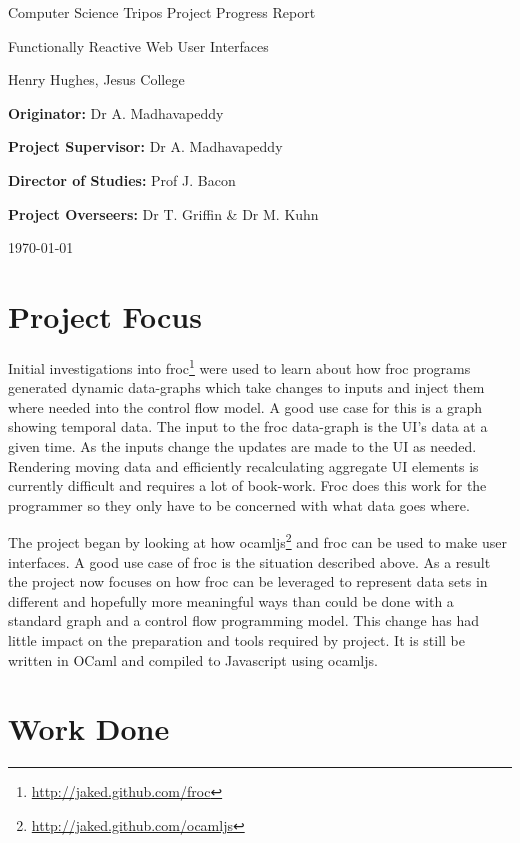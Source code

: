 \documentclass[10pt,a4paper]{article}
\begin{document}
  \begin{titlepage}
    \vfil
    \centerline{\Large Computer Science Tripos Project Progress Report}
    \vspace{0.4in}
    \centerline{\Huge Functionally Reactive Web User Interfaces }
    \vspace{0.4in}
    \centerline{\large Henry Hughes, Jesus College}
    \vspace{0.3in}
    \vfill
    \centerline{{\bf Originator:} Dr A. Madhavapeddy}
    \vspace{0.1in}
    \centerline{{\bf Project Supervisor:} Dr A. Madhavapeddy}
    \vspace{0.1in}
    \centerline{{\bf Director of Studies:} Prof J. Bacon}
    \vspace{0.1in}
    \centerline{{\bf Project Overseers:} Dr T. Griffin \& Dr M. Kuhn}
    \vspace{0.3in}
    \centerline{\large \today}
    \vfil
  \end{titlepage}
  
  \section{Project Focus}
Initial investigations into froc\footnote{\url{http://jaked.github.com/froc}} were used to learn about how froc programs generated dynamic data-graphs which take changes to inputs and inject them where needed into the control flow model. A good use case for this is a graph showing temporal data. The input to the froc data-graph is the UI's data at a given time. As the inputs change the updates are made to the UI as needed. Rendering moving data and efficiently recalculating aggregate UI elements is currently difficult and requires a lot of book-work. Froc does this work for the programmer so they only have to be concerned with what data goes where.

The project began by looking at how ocamljs\footnote{\url{http://jaked.github.com/ocamljs}} and froc can be used to make user interfaces. A good use case of froc is the situation described above. As a result the project now focuses on how froc can be leveraged to represent data sets in different and hopefully more meaningful ways than could be done with a standard graph and a control flow programming model. This change has had little impact on the preparation and tools required by project. It is still be written in OCaml and compiled to Javascript using ocamljs.

\section{Work Done}
\end{document}
